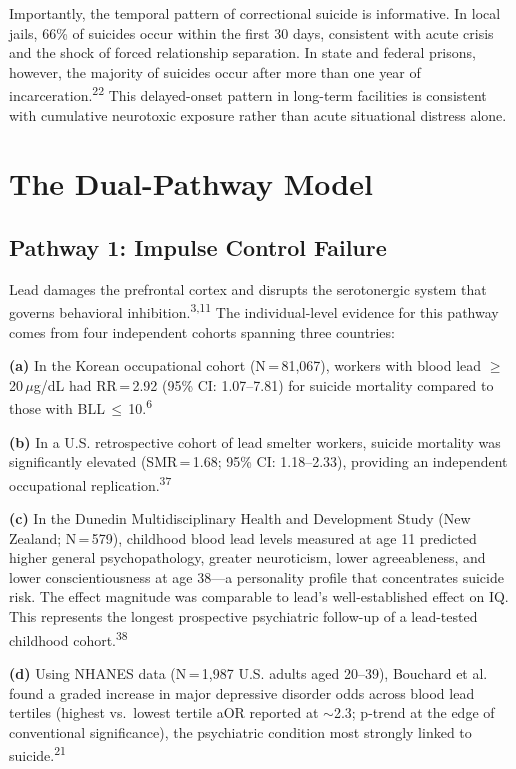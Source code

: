 \documentclass[11pt,twocolumn]{article}
\begin{document}
Importantly, the temporal pattern of correctional suicide is informative. In local jails, 66\% of suicides occur within the first 30 days, consistent with acute crisis and the shock of forced relationship separation. In state and federal prisons, however, the majority of suicides occur after more than one year of incarceration.\textsuperscript{22} This delayed-onset pattern in long-term facilities is consistent with cumulative neurotoxic exposure rather than acute situational distress alone.


\section{The Dual-Pathway Model}

\subsection{Pathway 1: Impulse Control Failure}
Lead damages the prefrontal cortex and disrupts the serotonergic system that governs behavioral inhibition.\textsuperscript{3,11} The individual-level evidence for this pathway comes from four independent cohorts spanning three countries:

\textbf{(a)} In the Korean occupational cohort (N\,=\,81,067), workers with blood lead $\geq$\,20\,$\mu$g/dL had RR\,=\,2.92 (95\% CI: 1.07--7.81) for suicide mortality compared to those with BLL\,$\leq$\,10.\textsuperscript{6}

\textbf{(b)} In a U.S. retrospective cohort of lead smelter workers, suicide mortality was significantly elevated (SMR\,=\,1.68; 95\% CI: 1.18--2.33), providing an independent occupational replication.\textsuperscript{37}

\textbf{(c)} In the Dunedin Multidisciplinary Health and Development Study (New Zealand; N\,=\,579), childhood blood lead levels measured at age 11 predicted higher general psychopathology, greater neuroticism, lower agreeableness, and lower conscientiousness at age 38---a personality profile that concentrates suicide risk. The effect magnitude was comparable to lead's well-established effect on IQ. This represents the longest prospective psychiatric follow-up of a lead-tested childhood cohort.\textsuperscript{38}

\textbf{(d)} Using NHANES data (N\,=\,1,987 U.S. adults aged 20--39), Bouchard et al. found a graded increase in major depressive disorder odds across blood lead tertiles (highest vs.\ lowest tertile aOR reported at $\sim$2.3; p-trend at the edge of conventional significance), the psychiatric condition most strongly linked to suicide.\textsuperscript{21}
\end{document}
